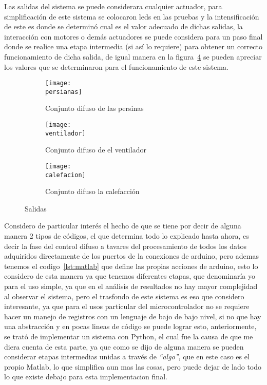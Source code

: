 \documentclass[a4paper, 12pt]{article}
\newcommand{\persianas}{img/per.png}
\newcommand{\ventilador}{img/vent.png}
\newcommand{\calefacion}{img/cale.png}
\begin{document}
    Las salidas del sistema se puede considerara cualquier actuador, para simplificación de este sistema se colocaron leds en las pruebas y la intensificación de este es donde se determinó cual es el valor adecuado de dichas salidas, la interacción con motores o demás actuadores se puede considera para un paso final donde se realice una etapa intermedia (si así lo requiere) para obtener un correcto funcionamiento de dicha salida, de igual manera en la figura~\ref{fig:out} se pueden apreciar los valores que se determinaron para el funcionamiento de este sistema.

    \begin{figure}[H]
        \centering

        \begin{subfigure}{0.8\linewidth}
            \texttt{[image: \\persianas]}
            \caption{Conjunto difuso de las persinas}
            \label{sub:per}
        \end{subfigure}

        \begin{subfigure}{0.8\linewidth}
            \texttt{[image: \\ventilador]}
            \caption{Conjunto difuso de el ventilador}
            \label{sub:vent}
        \end{subfigure}

        \begin{subfigure}{0.8\linewidth}
            \texttt{[image: \\calefacion]}
            \caption{Conjunto difuso la calefacción }
            \label{sub:cale}
        \end{subfigure}

        \caption{Salidas}
        \label{fig:out}
    \end{figure}

    Considero de particular interés el hecho de que se tiene por decir de alguna manera 2 tipos de códigos, el que determina todo lo explicado hasta ahora, es decir la fase del control difuso a tavares del procesamiento de todos los datos adquiridos directamente de los puertos de la conexiones de arduino, pero ademas tenemos el codigo~\ref{lst:matlab} que define las propias acciones de arduino, esto lo considero de esta manera ya que tenemos diferentes etapas, que denominaría yo para el uso simple, ya que en el análisis de resultados no hay mayor complejidad al observar el sistema, pero el trasfondo de este sistema es eso que considero interesante, ya que para el usos particular del microcontrolador no se requiere hacer un manejo de registros con un lenguaje de bajo de bajo nivel, si no que hay una abstracción y en pocas lineas de código se puede lograr esto, anteriormente, se trató de implementar un sistema con Python, el cual fue la causa de que me diera cuenta de esta parte, ya que como se dijo de alguna manera se pueden considerar etapas intermedias unidas a través de \emph{“algo”}, que en este caso es el propio Matlab, lo que simplifica aun  mas las cosas, pero puede dejar de lado todo lo que existe debajo para esta implementacion final.
\end{document}
